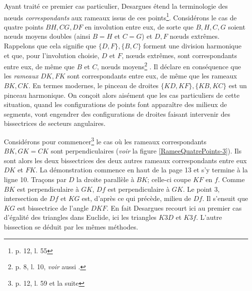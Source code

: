 \documentclass[12pt, a4paper]{article}
\begin{document}
Ayant traité ce premier cas particulier, Desargues étend la terminologie des n{\oe}uds \emph{correspondants} aux rameaux issus de ces points\footnote{p. 12, l. 55}. Considérons le cas de quatre points $BH, CG, DF$ en involution entre eux, de sorte que $B,H,C,G$ soient n{\oe}uds moyens doubles (ainsi $B=H$ et $C=G$) et $D,F$ n{\oe}uds extrêmes. Rappelons que cela signifie que $\{D,F\}, \{B,C\}$ forment une division harmonique et que, pour l'involution choisie,  $D$ et $F$, n{\oe}uds extrêmes, sont correspondants entre eux, de même que $B$ et $C$, n{\oe}uds moyens\footnote{p. 8, l. 10, \textit{voir} aussi \cite{anglade-briend-1}.} . Il déclare en conséquence que les \emph{rameaux} $DK,FK$ sont correspondants entre eux, de même que les rameaux $BK,CK$. En termes modernes, le pinceau de droites $\{KD,KF\}, \{KB, KC\}$ est un pinceau harmonique. On conçoit alors aisément que les cas particuliers de cette situation, quand les configurations de points font apparaître des milieux de segments, vont engendrer des configurations de droites faisant intervenir des bissectrices de secteurs angulaires.  

Considérons pour commencer\footnote{p. 12, l. 59 et la suite} le cas où les rameaux correspondants $BK,GK=CK$ sont perpendiculaires (\textit{voir} la figure \ref{RameeQuatrePoints-3}). Ils sont alors les deux bissectrices des deux autres rameaux correspondants entre eux $DK$ et $FK$. La démonstration commence en haut de la page 13 et s'y termine à la ligne 10. Traçons par $D$ la droite parallèle à $BK$; celle-ci coupe $KF$ en $f$. Comme $BK$ est perpendiculaire à $GK$, $Df$ est perpendiculaire à $GK$. Le point $3$, intersection de $Df$ et $KG$ est, d'après ce qui précède, milieu de $Df$. Il s'ensuit que $KG$ est bissectrice de l'angle $DKF$. En fait Desargues recourt ici au premier cas d'égalité des triangles dans Euclide, ici les triangles $K3D$ et $K3f$. 
L'autre bissection se déduit par les mêmes méthodes.
\end{document}
